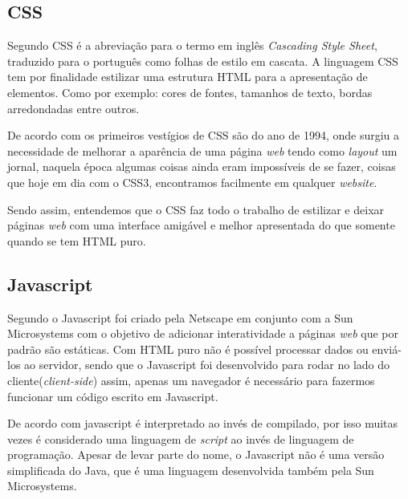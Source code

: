 	\subsection{CSS}
		\par Segundo  CSS é a abreviação para o termo em inglês \textit{Cascading Style Sheet}, traduzido para o
		português como folhas de estilo em cascata. A linguagem CSS tem por finalidade estilizar uma estrutura HTML para a apresentação de elementos. Como por exemplo: cores de fontes, tamanhos de texto, bordas arredondadas entre outros.
		\par De acordo com  os primeiros vestígios de CSS são do ano de 1994, onde surgiu a necessidade de melhorar a aparência de uma página \textit{web} tendo como \textit{layout} um jornal, naquela época algumas coisas ainda eram impossíveis de se fazer, coisas que hoje em dia com o CSS3, encontramos facilmente em qualquer \textit{website}.
		\par Sendo assim, entendemos que o CSS faz todo o trabalho de estilizar e deixar páginas \textit{web} com uma interface amigável e melhor apresentada do que somente quando se tem HTML puro.
		
	\subsection{Javascript}
		\par Segundo  o Javascript foi criado pela Netscape em conjunto com a Sun Microsystems com o objetivo de adicionar interatividade a páginas \textit{web} que por padrão são estáticas. Com HTML puro não é possível processar dados ou enviá-los ao servidor, sendo que o Javascript foi desenvolvido para rodar no lado do cliente(\textit{client-side}) assim, apenas um navegador é necessário para fazermos funcionar um código escrito em Javascript.
		\par De acordo com  javascript é interpretado ao invés de compilado, por isso muitas vezes é considerado uma linguagem de \textit{script} ao invés de linguagem de programação. Apesar de levar parte do nome, o Javascript não é uma versão simplificada do Java, que é uma linguagem desenvolvida também pela Sun Microsystems.
		

